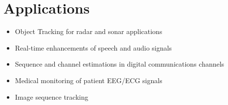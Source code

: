 \section{Applications}
\begin{itemize}
    \item Object Tracking for radar and sonar applications
    \item Real-time enhancements of speech and audio signals
    \item Sequence and channel estimations in digital communications channels
    \item Medical monitoring of patient EEG/ECG signals
    \item Image sequence tracking
\end{itemize}
